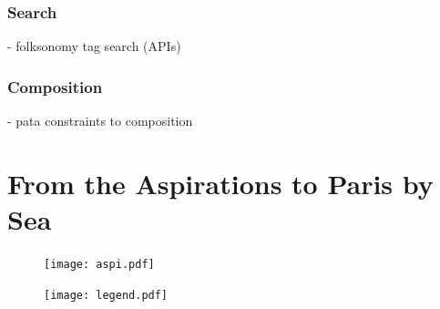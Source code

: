 \subsubsection{Search}

- folksonomy tag search (APIs)


\subsubsection{Composition}
\label{s:composition}

- pata constraints to composition




\section{From the Aspirations to Paris by Sea}

\begin{figure}[!htb]
\centering
  \texttt{[image: aspi.pdf]}
\end{figure}



\begin{figure}[!htb]
\centering
  \texttt{[image: legend.pdf]}
\end{figure}

\stopcontents[chapters]
